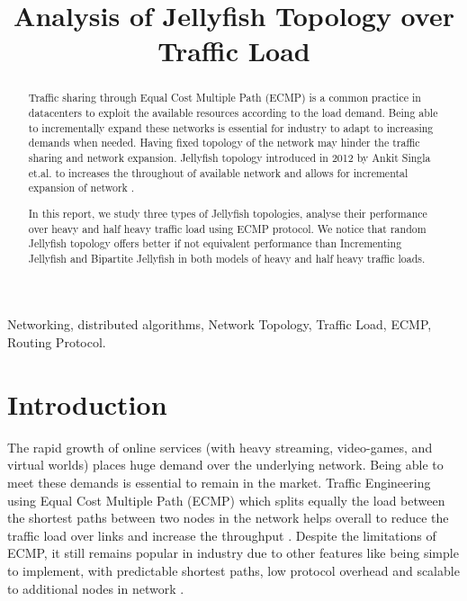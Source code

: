 \documentclass[conference]{IEEEtran}
\begin{document}
\title{Analysis of Jellyfish Topology over Traffic Load}

\author{
}

\maketitle

\begin{abstract}
  Traffic sharing through Equal Cost Multiple Path (ECMP) is a common practice in datacenters to exploit the available resources according to the load demand. Being able to incrementally expand these networks is essential for industry to adapt to increasing demands when needed. Having fixed topology of the network may hinder the traffic sharing and network expansion. Jellyfish topology introduced in 2012 by Ankit Singla et.al. to increases the throughout of available network and allows for incremental expansion of network \cite{Singla:12}. 
  
  In this report, we study three types of Jellyfish topologies, analyse their performance over heavy and half heavy traffic load using ECMP protocol. We notice that random Jellyfish topology offers better if not equivalent performance than Incrementing Jellyfish and Bipartite Jellyfish in both models of heavy and half heavy traffic loads.
\end{abstract}

\begin{IEEEkeywords}
Networking, distributed algorithms, Network Topology, Traffic Load, ECMP, Routing Protocol.
\end{IEEEkeywords}

\section{Introduction}


The rapid growth of online services (with heavy streaming, video-games, and virtual worlds) places huge demand over the underlying network. Being able to meet these demands is essential to remain in the market. Traffic Engineering using Equal Cost Multiple Path (ECMP) which splits equally the load between the shortest paths between two nodes in the network helps overall to reduce the traffic load over links and increase the throughput \cite{Thaler:20}. Despite the limitations of ECMP, it still remains popular in industry due to other features like being simple to implement, with predictable shortest paths, low protocol overhead and scalable to additional nodes in network \cite{Cheisa:17}. 
\end{document}
